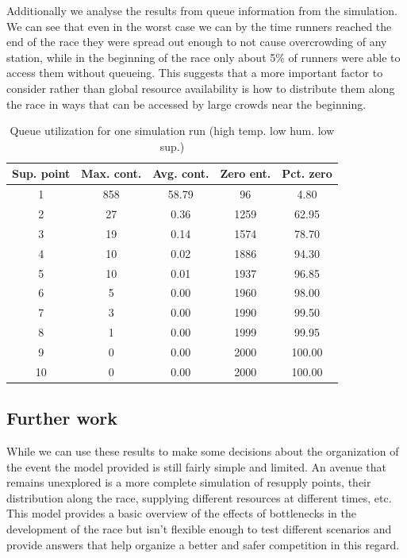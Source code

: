 \documentclass[conference]{IEEEtran}
\begin{document}
Additionally we analyse the results from queue information from the simulation. We can see that even in the worst case we can by the time runners reached the end of the race they were spread out enough to not cause overcrowding of any station, while in the beginning of the race only about 5\% of runners were able to access them without queueing. This suggests that a more important factor to consider rather than global resource availability is how to distribute them along the race in ways that can be accessed by large crowds near the beginning.

\begin{table}[htbp]
\caption{Queue utilization for one simulation run (high temp. low hum. low sup.)}
\begin{center}
\begin{tabular}{|c|c|c|c|c|}
\hline
\textbf{Sup. point}&\textbf{Max. cont.}&\textbf{Avg. cont.}&\textbf{Zero ent.}&\textbf{Pct. zero}\\
\hline
1&858&58.79&96&4.80\\
\hline
2&27&0.36&1259&62.95\\
\hline
3&19&0.14&1574&78.70\\
\hline
4&10&0.02&1886&94.30\\
\hline
5&10&0.01&1937&96.85\\
\hline
6&5&0.00&1960&98.00\\
\hline
7&3&0.00&1990&99.50\\
\hline
8&1&0.00&1999&99.95\\
\hline
9&0&0.00&2000&100.00\\
\hline
10&0&0.00&2000&100.00\\
\hline
\end{tabular}
\label{tab:queue_results}
\end{center}
\end{table}

\subsection{Further work}

While we can use these results to make some decisions about the organization of the event the model provided is still fairly simple and limited. An avenue that remains unexplored is a more complete simulation of resupply points, their distribution along the race, supplying different resources at different times, etc. This model provides a basic overview of the effects of bottlenecks in the development of the race but isn't flexible enough to test different scenarios and provide answers that help organize a better and safer competition in this regard.
\end{document}
